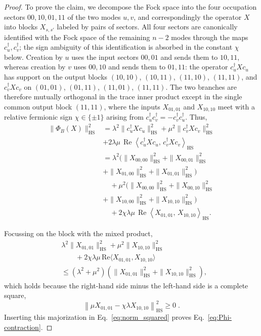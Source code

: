\documentclass[prx,twocolumn,superscriptaddress,aps,10pt, frontmatterverbose, reprint,footinbib,longbibliography=true]{revtex4-2}
\begin{document}
\begin{proof}
To prove the claim, we decompose the Fock space into the four occupation sectors $00,10,01,11$ of the two modes $u,v$, and correspondingly the operator $X$ into blocks $X_{s,s'}$ labeled by pairs of sectors. All four sectors are canonically identified with the Fock space of the remaining $n-2$ modes through the maps $c_u^\dagger,c_v^\dagger$; the sign ambiguity of this identification is absorbed in the constant $\chi$ below. Creation by $u$ uses the input sectors $00,01$ and sends them to $10,11$, whereas creation by $v$ uses $00,10$ and sends them to $01,11$: the operator $c_u^\dagger Xc_u$ has support on the output blocks $(10,10)$, $(10,11)$, $(11,10)$, $(11,11)$, and $c_v^\dagger Xc_v$ on $(01,01)$, $(01,11)$, $(11,01)$, $(11,11)$. The two branches are therefore mutually orthogonal in the trace inner product except in the single common output block $(11,11)$, where the inputs $X_{01,01}$ and $X_{10,10}$ meet with a relative fermionic sign $\chi\in\{\pm1\}$ arising from $c_u^\dagger c_v^\dagger=-c_v^\dagger c_u^\dagger$.
Thus, 
\begin{equation}
\label{eq:norm_squared}
\begin{aligned}
\|\Phi_B(X)\|_{\mathrm{HS}}^2
&=
\lambda^2 \|c_u^\dagger X c_u\|_{\mathrm{HS}}^2
+\mu^2 \|c_v^\dagger X c_v\|_{\mathrm{HS}}^2
\\
&+2\lambda\mu\,
\operatorname{Re}
\left\langle
c_u^\dagger X c_u,\,
c_v^\dagger X c_v
\right\rangle_{\mathrm{HS}}
\\[1ex]
&=
\lambda^2
(
\|X_{00,00}\|_{\mathrm{HS}}^2
+\|X_{00,01}\|_{\mathrm{HS}}^2
\\
&+\|X_{01,00}\|_{\mathrm{HS}}^2
+\|X_{01,01}\|_{\mathrm{HS}}^2 )
\\
&\quad
+\mu^2
(
\|X_{00,00}\|_{\mathrm{HS}}^2
+\|X_{00,10}\|_{\mathrm{HS}}^2
\\
&+\|X_{10,00}\|_{\mathrm{HS}}^2
+\|X_{10,10}\|_{\mathrm{HS}}^2 )
\\
&\quad
+2\chi\lambda\mu\,
\operatorname{Re}
\left\langle
X_{01,01},\,X_{10,10}
\right\rangle_{\mathrm{HS}} .
\end{aligned}
\end{equation}

Focussing on the block with the mixed product,
\begin{equation}
\begin{split}
    &\lambda^2\|X_{01,01}\|_{\mathrm{HS}}^2+\mu^2\|X_{10,10}\|_{\mathrm{HS}}^2\\
    &\qquad +2\chi\lambda\mu\,\mathrm{Re}\langle X_{01,01},X_{10,10}\rangle\\
    &\le(\lambda^2+\mu^2)\left(\|X_{01,01}\|_{\mathrm{HS}}^2+\|X_{10,10}\|_{\mathrm{HS}}^2\right),
\end{split}\end{equation}
which holds because the right-hand side minus the  left-hand side is a complete square,
\begin{equation}
    \left\|\mu X_{01,01}-\chi\lambda X_{10,10}\right\|_{\mathrm{HS}}^2\ge0\;.
\end{equation}
Inserting this majorization in Eq.~\eqref{eq:norm_squared} proves Eq.~\eqref{eq:Phi-contraction}.


\end{proof}
\end{document}
